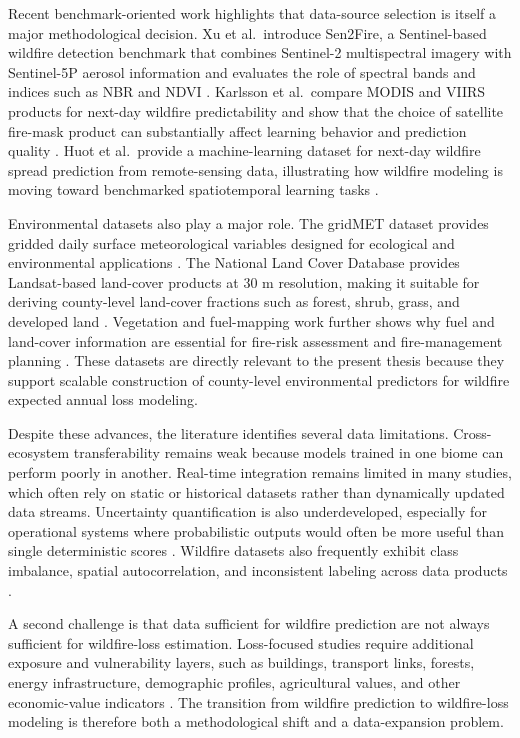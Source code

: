 Recent benchmark-oriented work highlights that data-source selection is itself a major methodological decision. Xu et al.\ introduce Sen2Fire, a Sentinel-based wildfire detection benchmark that combines Sentinel-2 multispectral imagery with Sentinel-5P aerosol information and evaluates the role of spectral bands and indices such as NBR and NDVI \citep{xu2024sen2fire}. Karlsson et al.\ compare MODIS and VIIRS products for next-day wildfire predictability and show that the choice of satellite fire-mask product can substantially affect learning behavior and prediction quality \citep{karlsson2025modisviirs}. Huot et al.\ provide a machine-learning dataset for next-day wildfire spread prediction from remote-sensing data, illustrating how wildfire modeling is moving toward benchmarked spatiotemporal learning tasks \citep{huot2022nextday}.

Environmental datasets also play a major role. The gridMET dataset provides gridded daily surface meteorological variables designed for ecological and environmental applications \citep{abatzoglou2013gridmet}. The National Land Cover Database provides Landsat-based land-cover products at 30 m resolution, making it suitable for deriving county-level land-cover fractions such as forest, shrub, grass, and developed land \citep{dewitz2021nlcd}. Vegetation and fuel-mapping work further shows why fuel and land-cover information are essential for fire-risk assessment and fire-management planning \citep{keane2001mapping}. These datasets are directly relevant to the present thesis because they support scalable construction of county-level environmental predictors for wildfire expected annual loss modeling.

Despite these advances, the literature identifies several data limitations. Cross-ecosystem transferability remains weak because models trained in one biome can perform poorly in another. Real-time integration remains limited in many studies, which often rely on static or historical datasets rather than dynamically updated data streams. Uncertainty quantification is also underdeveloped, especially for operational systems where probabilistic outputs would often be more useful than single deterministic scores \citep{jodhani2026ai,caron2025ai}. Wildfire datasets also frequently exhibit class imbalance, spatial autocorrelation, and inconsistent labeling across data products \citep{xu2024survey,caron2026multitarget,karlsson2025modisviirs}.

A second challenge is that data sufficient for wildfire prediction are not always sufficient for wildfire-loss estimation. Loss-focused studies require additional exposure and vulnerability layers, such as buildings, transport links, forests, energy infrastructure, demographic profiles, agricultural values, and other economic-value indicators \citep{asif2026supranational,ma2022supplychain,wang2021economicfootprint}. The transition from wildfire prediction to wildfire-loss modeling is therefore both a methodological shift and a data-expansion problem.

